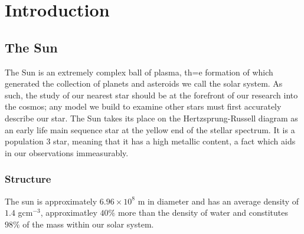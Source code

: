 
\newcommand{\pd}[2]{\frac{\partial #1}{\partial #2 }}
\newcommand{\td}[2]{\frac{d #1}{d #2 }}
\newcommand{\mb}[1]{\mathbf{#1}}
\newcommand{\divv}[1]{\bigtriangledown{#1}}
\newcommand{\del}{\bigtriangledown}

\label{ch:Intro}
\chapter{Introduction}  %





\section{The Sun}
The Sun is an extremely complex ball of plasma, th=e formation of which generated the collection of planets and asteroids we call the solar system.
As such, the study of our nearest star should be at the forefront of our research into the cosmos; any model we build to examine other stars must first accurately describe our star. 
The Sun takes its place on the Hertzsprung-Russell \cite{Hertzsprung} \cite{Russell1914} diagram as an early life main sequence star at the yellow end of the stellar spectrum.
It is a population 3 star, meaning that it has a high metallic content, a fact which aids in our observations immeasurably.

\subsection{Structure}
The sun is approximately $6.96 \times 10^{8}$ m in diameter and has an average density of $1.4$ gcm$^{-3}$, approximatley $40\%$ more than the density of water and constitutes $98\%$ of the mass within our solar system.

